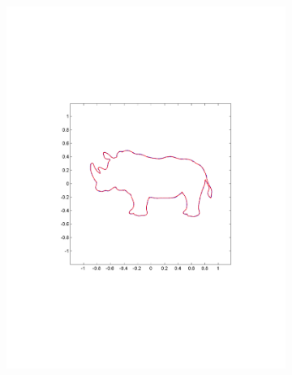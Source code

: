 \documentclass[annual]{acmsiggraph}
\begin{document}
\begin{figure}
        \centering
		\begin{subfigure}[b]{0.3\linewidth}
                \centering
                \includegraphics[width=\textwidth]{images/rhenoceros/1.pdf}
       \end{subfigure}
		~
		\begin{subfigure}[b]{0.33\linewidth}
                \centering

\end{subfigure}
\end{figure}
\end{document}
